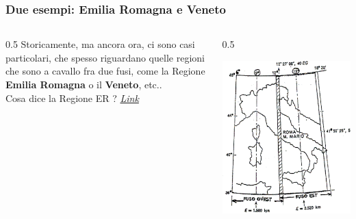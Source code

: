 \documentclass{beamer}
\begin{document}
{\begin{frame}
\end{frame}

\begin{frame}
	\frametitle{Due esempi: Emilia Romagna e Veneto}
	\begin{columns}	
		\begin{column} {0.5\textwidth}
			Storicamente, ma ancora ora, ci sono casi particolari,  che spesso riguardano quelle regioni che sono a cavallo fra due fusi, come la Regione \textbf{Emilia Romagna} o il \textbf{Veneto}, etc..
			\\
			\vspace{10pt}
			Cosa dice la Regione ER ? 
			\href{www.regione.emilia-romagna.it/entra-in-regione/archivio-cartografico/sistemi-di-riferimento-geodetici}{\textcolor{gter}{\emph{Link}}}
		\end{column}		
		\begin{column} {0.5\textwidth}
			\begin{center}
				\includegraphics[width=1\textwidth] {./pics/GB.png}
			\end{center}	
		\end{column}		
	\end{columns}
\end{frame}

}
\end{document}
